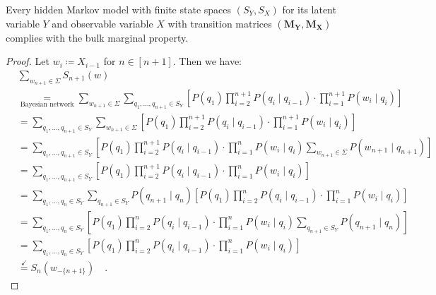 \documentclass[../../main.tex]{subfiles}
\begin{document}
    \begin{lemma}
        Every hidden Markov model with finite state spaces $(S_Y, S_X)$ for its latent variable $Y$ and observable variable $X$ with transition matrices $(\bm{M_Y}, \bm{M_X})$ complies with the bulk marginal property.
    \end{lemma}
    \vspace{-2.5em}
    \begin{proof}
        Let $w_i \coloneqq X_{i - 1}$ for $n \in [n + 1]$. Then we have:
        \begin{align*}
            &\sum_{w_{n + 1} \in \Sigma} S_{n + 1}(w) \\
            &\underset{\text{Bayesian network}}{=} \sum_{w_{n + 1} \in \Sigma} \sum_{q_1, \dots, q_{n+1} \in S_Y} \left[ P(q_1) \prod_{i=2}^{n+1} P(q_i \mid q_{i-1}) \cdot \prod_{i=1}^{n+1} P(w_i \mid q_i) \right] \\
            &= \sum_{q_1, \dots, q_{n+1} \in S_Y} \sum_{w_{n + 1} \in \Sigma}  \left[ P(q_1) \prod_{i=2}^{n+1} P(q_i \mid q_{i-1}) \cdot \prod_{i=1}^{n+1} P(w_i \mid q_i) \right] \\
            &= \sum_{q_1, \dots, q_{n+1} \in S_Y} \left[ P(q_1) \prod_{i=2}^{n+1} P(q_i \mid q_{i-1}) \cdot \prod_{i=1}^{n} P(w_i \mid q_i) \sum_{w_{n + 1} \in \Sigma}  P(w_{n+1} \mid q_{n+1}) \right] \\
            &= \sum_{q_1, \dots, q_{n+1} \in S_Y} \left[ P(q_1) \prod_{i=2}^{n+1} P(q_i \mid q_{i-1}) \cdot \prod_{i=1}^{n} P(w_i \mid q_i) \right] \\
            &= \sum_{q_1, \dots, q_{n} \in S_Y} \sum_{q_{n+1} \in S_Y} P(q_{n+1} \mid q_n) \left[ P(q_1) \prod_{i=2}^{n} P(q_i \mid q_{i-1}) \cdot \prod_{i=1}^{n} P(w_i \mid q_i) \right] \\
            &= \sum_{q_1, \dots, q_{n} \in S_Y} \left[ P(q_1) \prod_{i=2}^{n} P(q_i \mid q_{i-1}) \cdot \prod_{i=1}^{n} P(w_i \mid q_i) \sum_{q_{n+1} \in S_Y} P(q_{n+1} \mid q_n) \right] \\
            &= \sum_{q_1, \dots, q_{n} \in S_Y} \left[ P(q_1) \prod_{i=2}^{n} P(q_i \mid q_{i-1}) \cdot \prod_{i=1}^{n} P(w_i \mid q_i) \right] \\
            &\overset{\checkmark}{=} S_n(w_{-\{n+1\}}) \quad .
        \end{align*}
    \end{proof}
\end{document}
